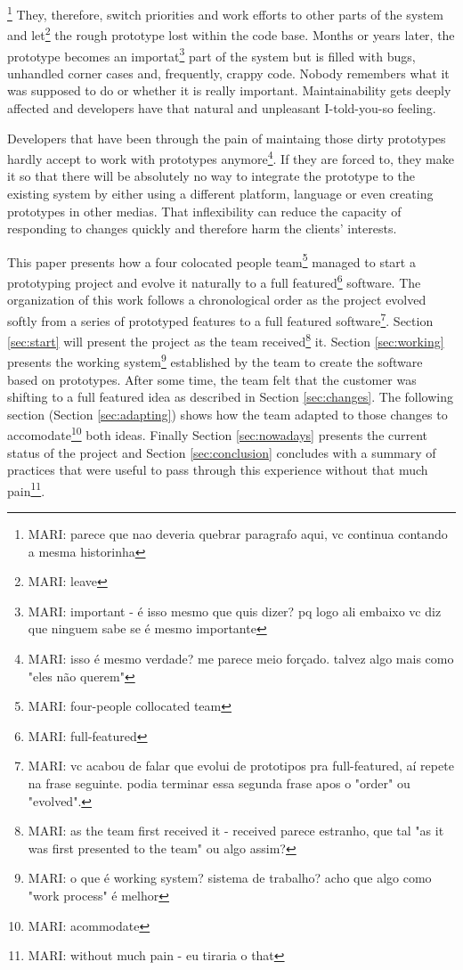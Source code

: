 \documentclass[lnbip]{svmultln}
\newcommand{\mari}[1]{\footnote{MARI: #1}}
\begin{document}
\mari{parece que nao deveria quebrar paragrafo aqui, vc continua contando a
mesma historinha} They, therefore, switch priorities and work efforts to other
parts of the system and let\mari{leave} the rough prototype lost within the code
base. Months or years later, the prototype becomes an importat\mari{important -
é isso mesmo que quis dizer? pq logo ali embaixo vc diz que ninguem sabe se é
mesmo importante} part of the system but is filled with bugs, unhandled corner
cases and, frequently, crappy code. Nobody remembers what it was supposed to do
or whether it is really important. Maintainability gets deeply affected and
developers have that natural and unpleasant I-told-you-so feeling.

Developers that have been through the pain of maintaing those dirty prototypes
hardly accept to work with prototypes anymore\mari{isso é mesmo verdade? me
parece meio forçado. talvez algo mais como "eles não querem"}. If they are
forced to, they make it so that there will be absolutely no way to integrate the
prototype to the existing system by either using a different platform, language
or even creating prototypes in other medias. That inflexibility can reduce the
capacity of responding to changes quickly and therefore harm the clients'
interests.

This paper presents how a four colocated people team\mari{four-people collocated
team} managed to start a prototyping project and evolve it naturally to a full
featured\mari{full-featured} software. The organization of this work follows a
chronological order as the project evolved softly from a series of prototyped
features to a full featured software\mari{vc acabou de falar que evolui de
prototipos pra full-featured, aí repete na frase seguinte. podia terminar essa
segunda frase apos o "order" ou "evolved".}. Section \ref{sec:start} will
present the project as the team received\mari{as the team first received it -
received parece estranho, que tal "as it was first presented to the team" ou
algo assim?} it. Section \ref{sec:working} presents the working system\mari{o
que é working system? sistema de trabalho? acho que algo como "work process" é
melhor} established by the team to create the software based on prototypes.
After some time, the team felt that the customer was shifting to a full featured
idea as described in Section \ref{sec:changes}. The following section (Section
\ref{sec:adapting}) shows how the team adapted to those changes to
accomodate\mari{acommodate} both ideas. Finally Section \ref{sec:nowadays}
presents the current status of the project and Section \ref{sec:conclusion}
concludes with a summary of practices that were useful to pass through this
experience without that much pain\mari{without much pain - eu tiraria o that}.
\end{document}
